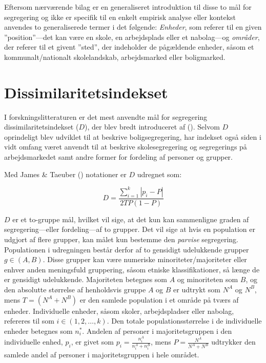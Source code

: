 \documentclass[
]{book}
\begin{document}
Eftersom nærværende bilag er en generaliseret introduktion til disse to mål for segregering og ikke er specifik til en enkelt empirisk analyse eller kontekst anvendes to generaliserede termer i det følgende: \emph{Enheder}, som referer til en given ''position''---det kan være en skole, en arbejdsplads eller et nabolag---og \emph{områder}, der referer til et givent ''sted'', der indeholder de pågældende enheder, såsom et kommunalt/nationalt skolelandskab, arbejdsmarked eller boligmarked.

\section{Dissimilaritetsindekset}\label{dissimkap}

I forskningslitteraturen er det mest anvendte mål for segregering dissimilaritetsindekset (\(D\)), der blev bredt introduceret af (). Selvom \(D\) oprindeligt blev udviklet til at beskrive boligsegregering, har indekset også siden i vidt omfang været anvendt til at beskrive skolesegregering og segregerings på arbejdsmarkedet samt andre former for fordeling af personer og grupper.

Med James \& Taeuber () notationer er \(D\) udregnet som:

\begin{equation}
\label{eq:dissim}
D=\frac{ {\textstyle \sum_{i=1}^{k} \left | p_{i} - P \right | } }{ 2TP \left ( 1-P \right ) }
\end{equation}

\(D\) er et to-gruppe mål, hvilket vil sige, at det kun kan sammenligne graden af segregering---eller fordeling---af to grupper. Det vil sige at hvis en population er udgjort af flere grupper, kan målet kun bestemme den \emph{parvise} segregering. Populationen i udregningen består derfor af to gensidigt udelukkende grupper \(g \in (A, B)\). Disse grupper kan være numeriske minoriteter/majoriteter eller enhver anden meningsfuld gruppering, såsom etniske klassifikationer, så længe de er gensidigt udelukkende. Majoriteten betegnes som \(A\) og minoriteten som \(B\), og den absolutte størrelse af henholdsvis gruppe \(A\) og \(B\) er udtrykt som \(N^{A}\) og \(N^{B}\), mens \(T=\left( N^{A} + N^{B} \right)\) er den samlede population i et område på tværs af enheder. Individuelle enheder, såsom skoler, arbejdspladser eller nabolag, refereres til som \(i \in (1, 2, \dots, k)\). Den totale populationsstørrelse i de individuelle enheder betegnes som \(n_{i}^{*}\). Andelen af personer i majoritetsgruppen i den individuelle enhed, \(p_{i}\), er givet som \(p_{i} = \frac{n_{i}^{A}}{n_{i}^{A} + n_{i}^{B}}\), mens \(P = \frac{N^{A}}{N^{A} + N^{B}}\) udtrykker den samlede andel af personer i majoritetsgruppen i hele området.
\end{document}
